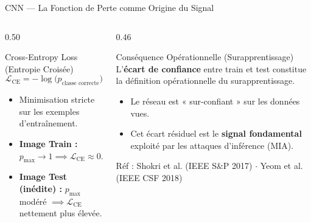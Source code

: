 \documentclass[aspectratio=169, 10pt, table]{beamer}
\begin{document}
\begin{frame}{CNN --- La Fonction de Perte comme Origine du Signal}
    \begin{columns}[T]
        \begin{column}{0.50\textwidth}
            \begin{block}{Cross-Entropy Loss (Entropie Croisée)}
                \small
                $$\mathcal{L}_{\text{CE}} = - \log\big(p_{\text{classe correcte}}\big)$$
                \vspace{-0.2cm}
                \begin{itemize}
                    \item Minimisation stricte sur les exemples d'entraînement.
                    \item \textbf{Image Train :} $p_{\max} \to 1 \implies \mathcal{L}_{\text{CE}} \approx 0$.
                    \item \textbf{Image Test (inédite) :} $p_{\max}$ modéré $\implies \mathcal{L}_{\text{CE}}$ nettement plus élevée.
                \end{itemize}
            \end{block}
        \end{column}

        \begin{column}{0.46\textwidth}
            \begin{alertblock}{Conséquence Opérationnelle (Surapprentissage)}
                \small
                L'\textbf{écart de confiance} entre train et test constitue la définition opérationnelle du surapprentissage.
                \begin{itemize}
                    \item Le réseau est « sur-confiant » sur les données vues.
                    \item Cet écart résiduel est le \textbf{signal fondamental} exploité par les attaques d'inférence (MIA).
                \end{itemize}
            \end{alertblock}
            \vspace{0.15cm}
            {\scriptsize Réf : Shokri et al. (IEEE S\&P 2017) $\cdot$ Yeom et al. (IEEE CSF 2018)}
        \end{column}
    \end{columns}
\end{frame}
\end{document}
